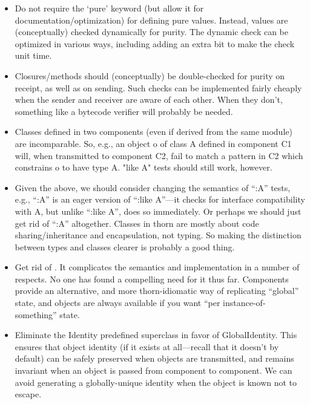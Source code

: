 \begin{itemize}\renewcommand{\labelitemi}{--}
\item Do not require the `pure' keyword (but allow it for documentation/optimization) for defining pure values.  Instead, values are (conceptually) checked dynamically for purity.  The dynamic check can be optimized in various ways, including adding an extra bit to make the check unit time. 

\item Closures/methods should (conceptually) be double-checked for purity on receipt, as well as on sending.  Such checks can be implemented fairly cheaply when the sender and receiver are aware of each other.  When they don't, something like a bytecode verifier will probably be needed. 

\item Classes defined in two components (even if derived from the same module) are incomparable.  So, e.g., an object o of class A defined in component C1 will, when transmitted to component C2, fail to match a pattern in C2 which constrains o to have type A.  "like A" tests should still work, however. 

\item Given the above, we should consider changing the semantics of ``:A'' tests, e.g., ``:A'' is an eager version of ``:like A''---it checks for interface compatibility with A, but unlike ``:like A'', does so immediately.  Or perhaps we should just get rid of ``:A'' altogether.  Classes in thorn are mostly about code sharing/inheritance and encapsulation, not typing.  So making the distinction between types and classes clearer is probably a good thing.

\item Get rid of .  It complicates the semantics and implementation in a number of respects.  No one has found a compelling need for it thus far.  Components provide an alternative, and more thorn-idiomatic way of replicating ``global'' state, and objects are always available if you want ``per instance-of-something'' state. 

\item Eliminate the Identity predefined superclass in favor of GlobalIdentity.  This ensures that object identity (if it exists at all---recall that it doesn't by default) can be safely preserved when objects are transmitted, and remains invariant when an object is passed from component to component.  We can avoid generating a globally-unique identity when the object is known not to escape.
\end{itemize}

